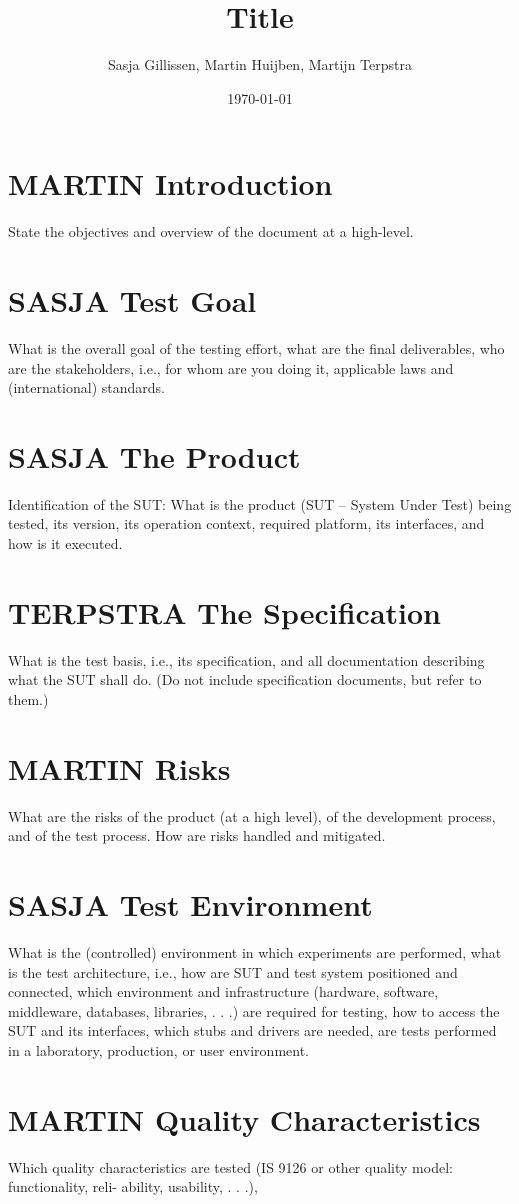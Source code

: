 \documentclass[11pt,a4paper]{article}
\author{Sasja Gillissen, Martin Huijben, Martijn Terpstra}
\date{\today}
\title{Title}
\begin{document}
\maketitle
\tableofcontents

\section{MARTIN Introduction}
State the objectives and overview of the document at a high-level.
\section{SASJA Test Goal}
What is the overall goal of the testing effort, what are the final deliverables, who are the
stakeholders, i.e., for whom are you doing it, applicable laws and (international) standards.
\section{SASJA The Product}
Identification of the SUT: What is the product (SUT – System Under Test) being tested, its
version, its operation context, required platform, its interfaces, and how is it executed.
\section{TERPSTRA The Specification}
What is the test basis, i.e., its specification, and all documentation describing what the SUT
shall do. (Do not include specification documents, but refer to them.)
\section{MARTIN Risks}
What are the risks of the product (at a high level), of the development process, and of the
test process. How are risks handled and mitigated.
\section{SASJA Test Environment}
What is the (controlled) environment in which experiments are performed, what is the test
architecture, i.e., how are SUT and test system positioned and connected, which environment
and infrastructure (hardware, software, middleware, databases, libraries, . . .) are required for
testing, how to access the SUT and its interfaces, which stubs and drivers are needed, are
tests performed in a laboratory, production, or user environment.
\section{MARTIN Quality Characteristics}
Which quality characteristics are tested (IS 9126 or other quality model: functionality, reli-
ability, usability, . . .),
\end{document}

